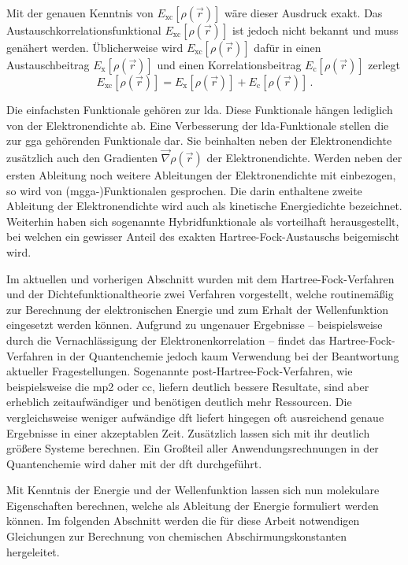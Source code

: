 Mit der genauen Kenntnis von $E_{\textrm{xc}}[\rho(\vec{r})]$ wäre dieser Ausdruck exakt. Das Austauschkorrelationsfunktional $E_{\textrm{xc}}[\rho(\vec{r})]$ ist jedoch nicht bekannt und muss genähert werden. Üblicherweise wird $E_{\textrm{xc}}[\rho(\vec{r})]$ dafür in einen Austauschbeitrag $E_{\textrm{x}}[\rho(\vec{r})]$ und einen Korrelationsbeitrag $E_{\textrm{c}}[\rho(\vec{r})]$ zerlegt
\begin{equation}
E_{\textrm{xc}}[\rho(\vec{r})] = E_{\textrm{x}}[\rho(\vec{r})] + E_{\textrm{c}}[\rho(\vec{r})]\, .
\end{equation}

Die einfachsten Funktionale gehören zur \ac{lda}. Diese Funktionale hängen lediglich von der Elektronendichte ab. Eine Verbesserung der \ac{lda}-Funktionale stellen die zur \ac{gga} gehörenden Funktionale dar. Sie beinhalten neben der Elektronendichte zusätzlich auch den Gradienten $\vec{\nabla}\rho(\vec{r})$ der Elektronendichte. Werden neben der ersten Ableitung noch weitere Ableitungen der Elektronendichte mit einbezogen, so wird von \mbox{(\acs{mgga}-)}Funktionalen gesprochen. Die darin enthaltene zweite Ableitung der Elektronendichte wird auch als kinetische Energiedichte bezeichnet. Weiterhin haben sich sogenannte Hybridfunktionale als vorteilhaft herausgestellt, bei welchen ein gewisser Anteil des exakten Hartree-Fock-Austauschs beigemischt wird.


\bigskip
Im aktuellen und vorherigen Abschnitt wurden mit dem Hartree-Fock-Verfahren und der Dichtefunktionaltheorie zwei Verfahren vorgestellt, welche routinemäßig zur Berechnung der elektronischen Energie und zum Erhalt der Wellenfunktion eingesetzt werden können. Aufgrund zu ungenauer Ergebnisse -- beispielsweise durch die Vernachlässigung der Elektronenkorrelation -- findet das Hartree-Fock-Verfahren in der Quantenchemie jedoch kaum Verwendung bei der Beantwortung aktueller Fragestellungen. Sogenannte post-Hartree-Fock-Verfahren, wie beispielsweise die \acl{mp2} oder \acl{cc}, liefern deutlich bessere Resultate, sind aber erheblich zeitaufwändiger und benötigen deutlich mehr Ressourcen. Die vergleichsweise weniger aufwändige \ac{dft} liefert hingegen oft ausreichend genaue Ergebnisse in einer akzeptablen Zeit. Zusätzlich lassen sich mit ihr deutlich größere Systeme berechnen. Ein Großteil aller Anwendungsrechnungen in der Quantenchemie wird daher mit der \ac{dft} durchgeführt. 

Mit Kenntnis der Energie und der Wellenfunktion lassen sich nun molekulare Eigenschaften berechnen, welche als Ableitung der Energie formuliert werden können. Im folgenden Abschnitt werden die für diese Arbeit notwendigen Gleichungen zur Berechnung von chemischen Abschirmungskonstanten hergeleitet.    


